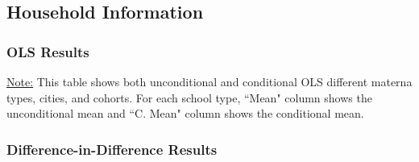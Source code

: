 \documentclass[11pt]{article}
\begin{document}
\subsection{Household Information}

\subsubsection{OLS Results}
\begin{table}[H]
\begin{center}
	\caption{OLS Results} \label{table:OLS-L}
	\scalebox{0.76}{
		\begin{tabular}{}
		
		\end{tabular}
	}
	\end{center}
	\footnotesize
\underline{Note:} This table shows both unconditional and conditional OLS different materna types, cities, and cohorts. For each school type, ``Mean" column shows the unconditional mean and ``C. Mean" column shows the conditional mean. 
\end{table}


\subsubsection{Difference-in-Difference Results}
\end{document}
